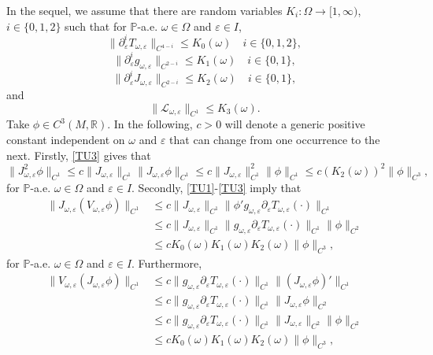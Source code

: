 \documentclass[11pt,reqno,a4paper]{article}
\theoremstyle{special}
\renewcommand{\epsilon}{\varepsilon}
\renewcommand{\L}{\mathcal{L}}
\def\R{\mathbb{R}}
\def\om{\omega}
\begin{document}
In the sequel, we assume that there are random variables $K_i \colon \Omega \to [1, \infty)$, $i\in \{0, 1, 2\}$ such that for $\mathbb P$-a.e. $\omega \in \Omega$ and $\epsilon \in I$,
\begin{equation}\label{TU1}
    \| \partial_\epsilon^i T_{\omega, \epsilon}\|_{C^{4-i}} \le K_0(\omega) \quad i\in \{0, 1, 2\},
\end{equation}
\begin{equation}\label{TU2}
\| \partial_\epsilon^i g_{\omega, \epsilon}\|_{C^{2-i}} \le K_1(\omega) \quad i\in \{0, 1\},
\end{equation}
\begin{equation}\label{TU3}
\|\partial_\epsilon^i J_{\omega, \epsilon}\|_{C^{2-i}} \le K_2(\omega) \quad i\in \{0, 1\},
\end{equation}
and
\begin{equation}\label{TU4}
\|\L_{\omega, \epsilon}\|_{C^1} \le K_3(\omega).
\end{equation}
 Take $\phi \in C^3(M, \R)$. In the following, $c>0$ will denote a generic positive constant independent on $\om$ and $\varepsilon$ that can change from one occurrence to the next.
Firstly,  \eqref{TU3} gives that 
\[
	\|J_{\omega,\epsilon}^2\phi\|_{C^1} \le c\|J_{\omega, \epsilon}\|_{C^1} \| J_{\omega, \epsilon}\phi \|_{C^1} \le c\|J_{\omega, \epsilon}\|_{C^1}^2 \| \phi \|_{C^1}\le c(K_2(\omega))^2\| \phi \|_{C^3}, 
	\]
for $\mathbb P$-a.e. $\omega \in \Omega$ and $\epsilon \in I$.
Secondly, \eqref{TU1}-\eqref{TU3} imply that 
	\[
	\begin{split}
		\|J_{\omega,\epsilon}(V_{\omega,\epsilon}\phi)\|_{C^1} & \le c\|J_{\omega, \epsilon}\|_{C^1} \|\phi'g_{\omega, \epsilon} \partial_{\epsilon}T_{\omega, \epsilon}(\cdot)\|_{C^1}  \\
		&\le  c\|J_{\omega, \epsilon}\|_{C^1} \|g_{\omega, \epsilon} \partial_{\epsilon}T_{\omega, \epsilon}(\cdot)\|_{C^1}  \|\phi\|_{C^2}\\
		&\le  cK_0(\omega)K_1(\omega)K_2(\omega)\|\phi\|_{C^3},
	\end{split}
	\]
 for $\mathbb P$-a.e. $\omega \in \Omega$ and $\epsilon \in I$.
 Furthermore, 
	\[
	\begin{split}
		\|V_{\omega,\epsilon}(J_{\omega,\epsilon}\phi)\|_{C^1} &\le c\|g_{\omega, \epsilon} \partial_{\epsilon}T_{\omega, \epsilon}(\cdot)\|_{C^1}  \|(J_{\omega,\epsilon}\phi)'\|_{C^1} \\
		&\le c\|g_{\omega, \epsilon} \partial_{\epsilon}T_{\omega, \epsilon}(\cdot)\|_{C^1}\|J_{\omega,\epsilon}\phi\|_{C^2} \\
		&\le c\|g_{\omega, \epsilon} \partial_{\epsilon}T_{\omega, \epsilon}(\cdot)\|_{C^1}\| J_{\omega, \epsilon}\|_{C^2}\|\phi\|_{C^2}\\
		&\le  cK_0(\omega)K_1(\omega)K_2(\omega)\|\phi\|_{C^3},
	\end{split}
	\]
\end{document}
